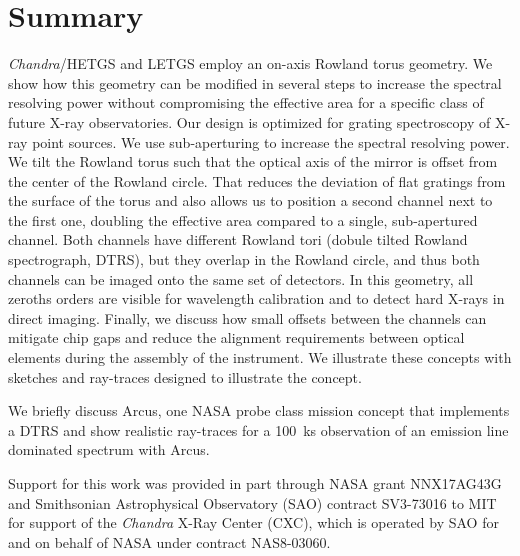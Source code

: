 \documentclass[linenumbers]{aastex631}
\begin{document}
\section{Summary}
\label{sect:summary}
\emph{Chandra}/HETGS and LETGS employ an on-axis Rowland torus geometry. We show how this geometry can be modified in several steps to increase the spectral resolving power without compromising the effective area for a specific class of future X-ray observatories. Our design is optimized for grating spectroscopy of X-ray point sources. We use sub-aperturing to increase the spectral resolving power. We tilt the Rowland torus such that the optical axis of the mirror is offset from the center of the Rowland circle. That reduces the deviation of flat gratings from the surface of the torus and also allows us to position a second channel next to the first one, doubling the effective area compared to a single, sub-apertured channel. Both channels have different Rowland tori (dobule tilted Rowland spectrograph, DTRS), but they overlap in the Rowland circle, and thus both channels can be imaged onto the same set of detectors. In this geometry, all zeroths orders are visible for wavelength calibration and to detect hard X-rays in direct imaging. Finally, we discuss how small offsets between the channels can mitigate chip gaps and reduce the alignment requirements between optical elements during the assembly of the instrument. We illustrate these concepts with sketches and ray-traces designed to illustrate the concept.

We briefly discuss Arcus, one NASA probe class mission concept that implements a DTRS and show realistic ray-traces for a 100~ks observation of an emission line dominated spectrum with Arcus.


\begin{acknowledgements}
Support for this work was provided in part through NASA grant NNX17AG43G and Smithsonian Astrophysical Observatory (SAO)
contract SV3-73016 to MIT for support of the {\em Chandra} X-Ray Center (CXC),
which is operated by SAO for and on behalf of NASA under contract NAS8-03060.

\end{acknowledgements}


{}



\end{document}
